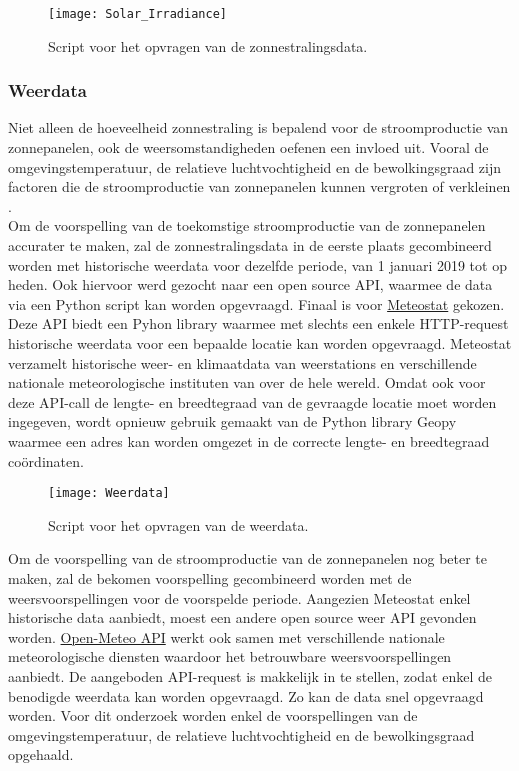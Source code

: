 \begin{figure}[h!]
    \centering\texttt{[image: Solar\_Irradiance]}
    \caption{\label{fig:Solar_Irradiance}Script voor het opvragen van de zonnestralingsdata.}
\end{figure} 

\subsubsection{Weerdata}

Niet alleen de hoeveelheid zonnestraling is bepalend voor de stroomproductie van zonnepanelen, ook de weersomstandigheden oefenen een invloed uit. Vooral de omgevingstemperatuur, de relatieve luchtvochtigheid en de bewolkingsgraad zijn factoren die de stroomproductie van zonnepanelen kunnen vergroten of verkleinen \autocite{Sehrawat2023}. \\

Om de voorspelling van de toekomstige stroomproductie van de zonnepanelen accurater te maken, zal de zonnestralingsdata in de eerste plaats gecombineerd worden met historische weerdata voor dezelfde periode, van 1 januari 2019 tot op heden. Ook hiervoor werd gezocht naar een open source API, waarmee de data via een Python script kan worden opgevraagd. Finaal is voor \href{https://dev.meteostat.net/}{Meteostat} gekozen. Deze API biedt een Pyhon library waarmee met slechts een enkele HTTP-request historische weerdata voor een bepaalde locatie kan worden opgevraagd. Meteostat verzamelt historische weer- en klimaatdata van weerstations en verschillende nationale meteorologische instituten van over de hele wereld. Omdat ook voor deze API-call de lengte- en breedtegraad van de gevraagde locatie moet worden ingegeven, wordt opnieuw gebruik gemaakt van de Python library Geopy waarmee een adres kan worden omgezet in de correcte lengte- en breedtegraad coördinaten. \\

\begin{figure}[h!]
    \centering\texttt{[image: Weerdata]}
    \caption{\label{fig:Weerdata}Script voor het opvragen van de weerdata.}
\end{figure} 

Om de voorspelling van de stroomproductie van de zonnepanelen nog beter te maken, zal de bekomen voorspelling gecombineerd worden met de weersvoorspellingen voor de voorspelde periode. Aangezien Meteostat enkel historische data aanbiedt, moest een andere open source weer API gevonden worden. \href{https://open-meteo.com/}{Open-Meteo API} werkt ook samen met verschillende nationale meteorologische diensten waardoor het betrouwbare weersvoorspellingen aanbiedt. De aangeboden API-request is makkelijk in te stellen, zodat enkel de benodigde weerdata kan worden opgevraagd. Zo kan de data snel opgevraagd worden. Voor dit onderzoek worden enkel de voorspellingen van de omgevingstemperatuur, de relatieve luchtvochtigheid en de bewolkingsgraad opgehaald.

